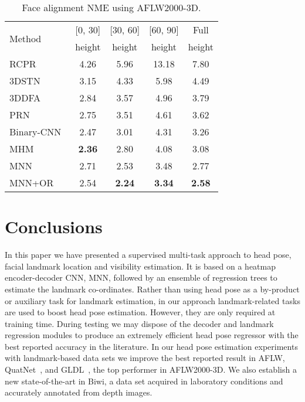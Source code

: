 \documentclass[9pt,technote,compsoc]{IEEEtran}
\begin{document}
\begin{table}[htbp!]
\begin{center}
\begin{tabular}{l|c|c|c|c}
\hline
\multirow{2}{*}{Method} & [0, 30] & [30, 60] & [60, 90] & Full\\
 & height & height & height & height\\
\hline
RCPR~\cite{Burgos13} & 4.26 & 5.96 & 13.18 & 7.80\\
3DSTN~\cite{Bhagavatula17} & 3.15 & 4.33 & 5.98 & 4.49\\
3DDFA~\cite{Zhu17} & 2.84 & 3.57 & 4.96 & 3.79\\
PRN~\cite{Feng18b} & 2.75 & 3.51 & 4.61 & 3.62\\
Binary-CNN~\cite{Bulat17a} & 2.47 & 3.01 & 4.31 & 3.26\\
MHM~\cite{Deng18} & \textbf{2.36} & 2.80 & 4.08 & 3.08\\
\hline
MNN & 2.71 & 2.53 & 3.48 & 2.77\\
MNN+OR & 2.54 & \textbf{2.24} & \textbf{3.34} & \textbf{2.58}\\
\hline
\end{tabular}
\end{center}
\caption{Face alignment NME using AFLW2000-3D.}
\label{table:multitask_300wlp}
\end{table}



\section{Conclusions}
\label{sec:conclusions}
In this paper we have presented a supervised multi-task approach to head pose, facial landmark location and visibility estimation. It is based on a heatmap encoder-decoder CNN, MNN, followed by an ensemble of regression trees to estimate the landmark co-ordinates. Rather than using head pose as a by-product or auxiliary task for landmark estimation, in our approach landmark-related tasks are used to boost head pose estimation. However, they are only required at training time. During testing we may dispose of the decoder and landmark regression modules to produce an extremely efficient head pose regressor with the best reported accuracy in the literature. In our head pose estimation experiments with landmark-based data sets we improve the best reported result in AFLW, QuatNet~\cite{Hsu18}, and GLDL~\cite{Liu19b}, the top performer in AFLW2000-3D. We also establish a new state-of-the-art in Biwi, a data set acquired in laboratory conditions and accurately annotated from depth images.  
\end{document}
